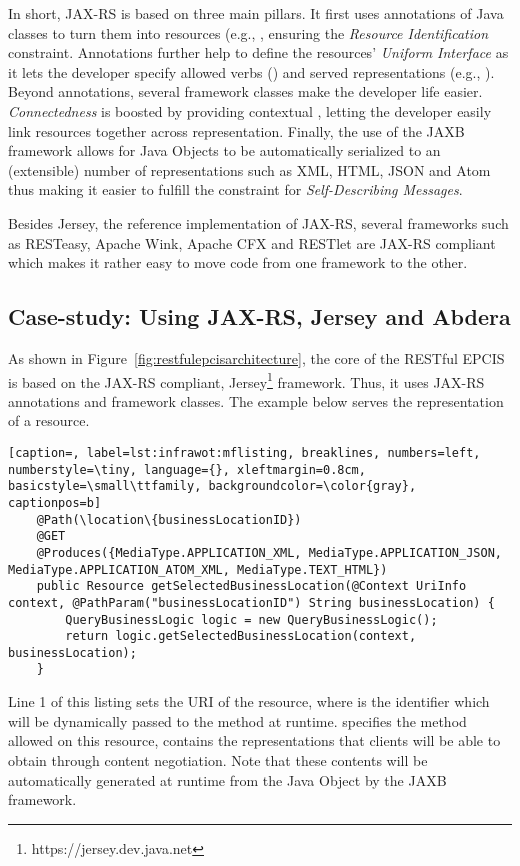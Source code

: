 In short, JAX-RS is based on three main pillars. It first uses annotations of Java classes to turn them into resources (e.g., , ensuring the \emph{Resource Identification} constraint. Annotations further help to define the resources' \emph{Uniform Interface} as it lets the developer specify allowed verbs () and served representations (e.g., ).
Beyond annotations, several framework classes make the developer life easier. \emph{Connectedness} is boosted by providing contextual , letting the developer easily link resources together across representation. Finally, the use of the JAXB framework allows for Java Objects to be automatically serialized to an (extensible) number of representations such as XML, HTML, JSON and Atom thus making it easier to fulfill the constraint for \emph{Self-Describing Messages}.

Besides Jersey, the reference implementation of JAX-RS, several frameworks such as RESTeasy, Apache Wink, Apache CFX and RESTlet are JAX-RS compliant which makes it rather easy to move code from one framework to the other.

\subsection{Case-study: Using JAX-RS, Jersey and Abdera}
As shown in Figure~\ref{fig:restfulepcisarchitecture}, the core of the RESTful EPCIS is based on the JAX-RS compliant, Jersey\footnote{https://jersey.dev.java.net} framework. Thus, it uses JAX-RS annotations and framework classes. The example below serves the representation of a  resource.
\begin{lstlisting}[caption=, label=lst:infrawot:mflisting, breaklines, numbers=left, numberstyle=\tiny, language={}, xleftmargin=0.8cm, basicstyle=\small\ttfamily, backgroundcolor=\color{gray}, captionpos=b]
    @Path(\location\{businessLocationID})
    @GET
    @Produces({MediaType.APPLICATION_XML, MediaType.APPLICATION_JSON, MediaType.APPLICATION_ATOM_XML, MediaType.TEXT_HTML})
    public Resource getSelectedBusinessLocation(@Context UriInfo context, @PathParam("businessLocationID") String businessLocation) {
        QueryBusinessLogic logic = new QueryBusinessLogic();
        return logic.getSelectedBusinessLocation(context, businessLocation);
    }
\end{lstlisting}
Line 1 of this listing sets the URI of the resource, where  is the  identifier which will be dynamically passed to the method  at runtime.  specifies the method allowed on this resource,  contains the representations that clients will be able to obtain through content negotiation. Note that these contents will be automatically generated at runtime from the  Java Object by the JAXB framework.

